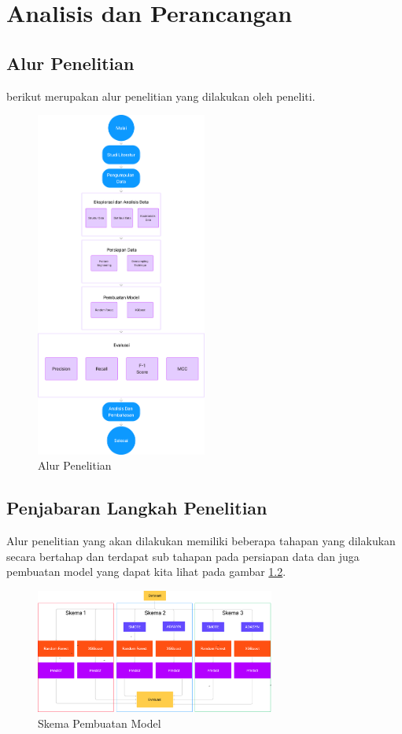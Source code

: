 \newpage
\chapter{Analisis dan Perancangan} \label{Bab III}

\section{Alur Penelitian} \label{III.Alur}
berikut merupakan alur penelitian yang dilakukan oleh peneliti.
\begin{figure}[H]
	\centering
	\includegraphics[width=0.5\textwidth]{figure/alur_penelitian.png}
	\caption{Alur Penelitian}
	\label{fig:3.alur penelitian}
\end{figure}

\section{Penjabaran Langkah Penelitian} \label{III.Jabar Alur}
Alur penelitian yang akan dilakukan memiliki beberapa tahapan yang dilakukan secara bertahap dan terdapat sub tahapan pada persiapan data dan juga pembuatan model yang dapat kita lihat pada gambar \ref{fig:3.Skema Pembuatan Model}.
\begin{figure}[H]
	\centering
	\includegraphics[width=0.7\textwidth]{figure/pembuatanmodel.png}
	\caption{Skema Pembuatan Model}
	\label{fig:3.Skema Pembuatan Model}
\end{figure}

